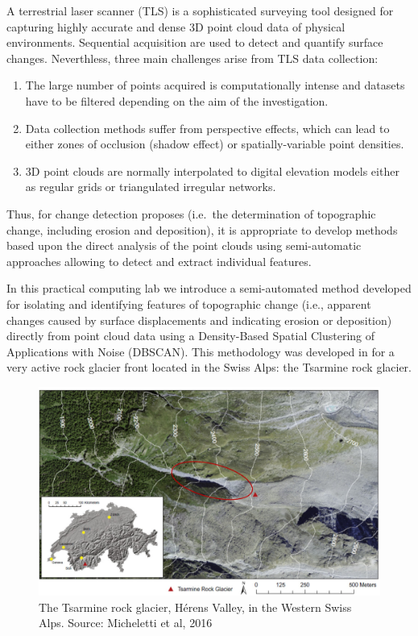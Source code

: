\documentclass[
]{article}
\providecommand{\tightlist}{%
  \setlength{\itemsep}{0pt}\setlength{\parskip}{0pt}}
\begin{document}
A terrestrial laser scanner (TLS) is a sophisticated surveying tool designed for capturing highly accurate and dense 3D point cloud data of physical environments.
Sequential acquisition are used to detect and quantify surface changes.
Neverthless, three main challenges arise from TLS data collection:

\begin{enumerate}
\def\labelenumi{\arabic{enumi}.}
\tightlist
\item
  The large number of points acquired is computationally intense and datasets have to be filtered depending on the aim of the investigation.
\item
  Data collection methods suffer from perspective effects, which can lead to either zones of occlusion (shadow effect) or spatially-variable point densities.
\item
  3D point clouds are normally interpolated to digital elevation models either as regular grids or triangulated irregular networks.
\end{enumerate}

Thus, for change detection proposes (i.e.~the determination of topographic change, including erosion and deposition), it is appropriate to develop methods based upon the direct analysis of the point clouds using semi-automatic approaches allowing to detect and extract individual features.

In this practical computing lab we introduce a semi-automated method developed for isolating and identifying features of topographic change (i.e., apparent changes caused by surface displacements and indicating erosion or deposition) directly from point cloud data using a Density-Based Spatial Clustering of Applications with Noise (DBSCAN).
This methodology was developed in \citet{micheletti_geomorphological_2017} for a very active rock glacier front located in the Swiss Alps: the Tsarmine rock glacier.

\begin{figure}

{\centering \includegraphics[width=0.5\linewidth,height=0.7\textheight]{images/Tsarmine2} 

}

\caption{The Tsarmine rock glacier, Hérens Valley, in the Western Swiss Alps. Source: Micheletti et al, 2016 \label{Tsarmine}}\label{fig:jpg}
\end{figure}
\end{document}

